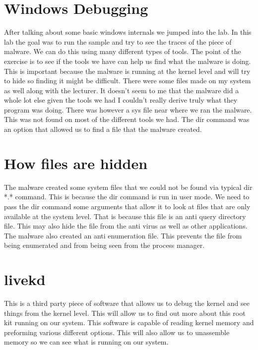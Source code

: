 \documentclass[letterpaper, onecolumn,10pt]{IEEEtran}
\begin{document}
		    \section{Windows Debugging}
		    After talking about some basic windows internals we jumped into the lab. In this lab the goal was to run the sample and try to see the traces of the piece of malware. We can do this using many different types of tools. The point of the exercise is to see if the tools we have can help us find what the malware is doing. This is important because the malware is running at the kernel level and will try to hide so finding it might be difficult. There were some files made on my system as well along with the lecturer. It doesn't seem to me that the malware did a whole lot else given the tools we had I couldn't really derive truly what they program was doing. There was however a sys file near where we ran the malware. This was not found on most of the different tools we had. The dir command was an option that allowed us to find a file that the malware created.\\
		    
		    \section{How files are hidden}
		    The malware created some system files that we could not be found via typical dir *.* command. This is because the dir command is run in user mode. We need to pass the dir command some arguments that allow it to look at files that are only available at the system level. That is because this file is an anti query directory file. This may also hide the file from the anti virus as well as other applications. The malware also created an anti enumeration file. This prevents the file from being enumerated and from being seen from the process manager.\\
		    
		    \section{livekd}
		    This is a third party piece of software that allows us to debug the kernel and see things from the kernel level. This will allow us to find out more about this root kit running on our system. This software is capable of reading kernel memory and preforming various different options. This will also allow us to unassemble memory so we can see what is running on our system.\\
		    
\end{document}

